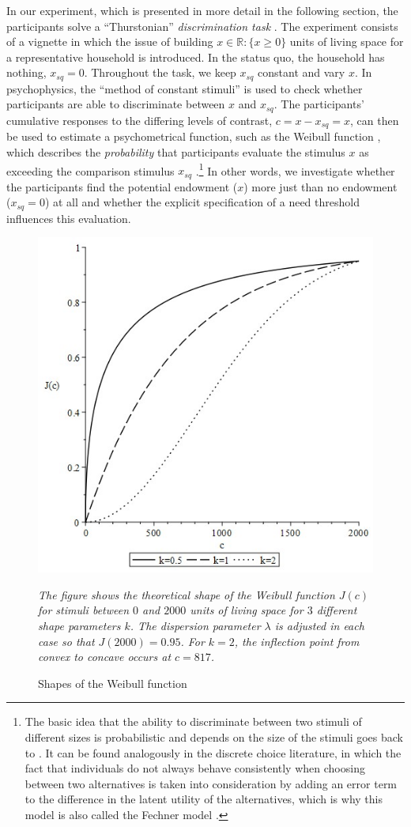 \documentclass[12pt]{scrartcl}
\begin{document}
In our experiment, which is presented in more detail in the following section, the participants solve a ``Thurstonian'' \textit{discrimination task} \citep[pp.~101--104]{marks_psychophysical_2002}.
The experiment consists of a vignette in which the issue of building $x\in\mathbb{R}:\{x\ge0\}$ units of living space for a representative household is introduced.
In the status quo, the household has nothing, $x_{sq}=0$.
Throughout the task, we keep $x_{sq}$ constant and vary $x$.
In psychophysics, the ``method of constant stimuli'' is used to check whether participants are able to discriminate between $x$ and $x_{sq}$.
The participants' cumulative responses to the differing levels of contrast, $c=x-x_{sq}=x$, can then be used to estimate a psychometrical function, such as the Weibull function \citep{wichmann_psychometric_2001,mortensen_additive_2002}, which describes the \textit{probability} that participants evaluate the stimulus $x$ as exceeding the comparison stimulus $x_{sq}$ \citep[p.~2503]{treutwein_adaptive_1995}.\footnote{The basic idea that the ability to discriminate between two stimuli of different sizes is probabilistic and depends on the size of the stimuli goes back to \citet{fechner_elemente_1860}. It can be found analogously in the discrete choice literature, in which the fact that individuals do not always behave consistently when choosing between two alternatives is taken into consideration by adding an error term to the difference in the latent utility of the alternatives, which is why this model is also called the Fechner model \citep[see, e.\,g.,][]{blavatskyy_fechner_2018}.}
In other words, we investigate whether the participants find the potential endowment ($x$) more just than no endowment ($x_{sq}=0$) at all and whether the explicit specification of a need threshold influences this evaluation.

\begin{figure}[h!t!]
   \centering
   \includegraphics[width=0.5\linewidth]{figures/figure_1.jpg}
   \begin{minipage}{\linewidth}
   \footnotesize
   \textit{The figure shows the theoretical shape of the Weibull function $J(c)$ for stimuli between $0$ and $2000$ units of living space for $3$ different shape parameters $k$. The dispersion parameter $\lambda$ is adjusted in each case so that $J(2000)=0.95$. For $k=2$, the inflection point from convex to concave occurs at $c=817$.}
   \end{minipage}
   \caption{Shapes of the Weibull function}
   \label{fig:figure_1}
\end{figure}
\end{document}
